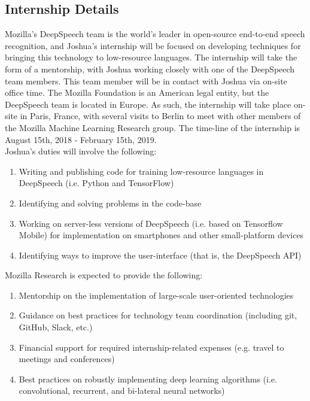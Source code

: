 \documentclass[12pt,a4paper]{article}
\begin{document}
\subsection*{Internship Details}

Mozilla's DeepSpeech team is the world's leader in open-source end-to-end speech recognition, and Joshua's internship will be focused on developing techniques for bringing this technology to low-resource languages. The internship will take the form of a mentorship, with Joshua working closely with one of the DeepSpeech team members. This team member will be in contact with Joshua via on-site office time. The Mozilla Foundation is an American legal entity, but the DeepSpeech team is located in Europe. As such, the internship will take place on-site in Paris, France, with several visits to Berlin to meet with other members of the Mozilla Machine Learning Research group. The time-line of the internship is August 15th, 2018 - February 15th, 2019.\\

\noindent Joshua's duties will involve the following:

\begin{enumerate}
\item Writing and publishing code for training low-resource languages in DeepSpeech (i.e. Python and TensorFlow)
\item Identifying and solving problems in the code-base
\item Working on server-less versions of DeepSpeech (i.e. based on Tensorflow Mobile) for implementation on smartphones and other small-platform devices
\item Identifying ways to improve the user-interface (that is, the DeepSpeech API)\\
\end{enumerate}

\vspace{.1cm}

\noindent Mozilla Research is expected to provide the following:

\begin{enumerate}
\item Mentorship on the implementation of large-scale user-oriented technologies
\item Guidance on best practices for technology team coordination (including git, GitHub, Slack, etc.)
\item Financial support for required internship-related expenses (e.g. travel to meetings and conferences)
\item Best practices on robustly implementing deep learning algorithms (i.e. convolutional, recurrent, and bi-lateral neural networks)  
\end{enumerate}
\end{document}
